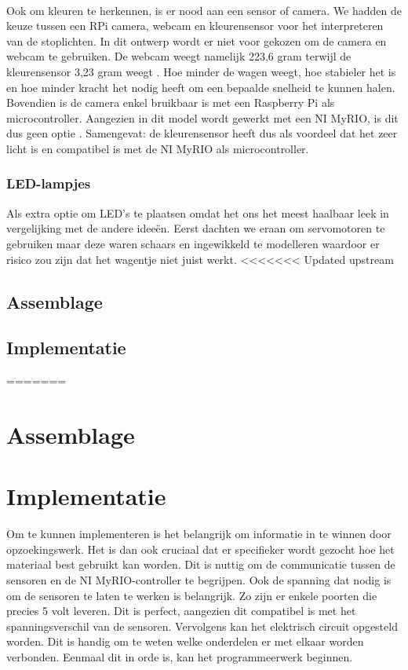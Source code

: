 \documentclass[a4paper,twoside,kulak]{kulakreport} %
\begin{document}
~

Ook om kleuren te herkennen, is er nood aan een sensor of camera. We hadden de keuze tussen een RPi camera, webcam en kleurensensor voor het interpreteren van de stoplichten. In dit ontwerp wordt er niet voor gekozen om de camera en webcam te gebruiken. De webcam weegt namelijk 223,6 gram terwijl de kleurensensor 3,23 gram weegt \cite{Webcam,TCS34725KleurSensorBOB}. Hoe minder de wagen weegt, hoe stabieler het is en hoe minder kracht het nodig heeft om een bepaalde snelheid te kunnen halen. Bovendien is de camera enkel bruikbaar is met een Raspberry Pi als microcontroller. Aangezien in dit model wordt gewerkt met een NI MyRIO, is dit dus geen optie \cite{RPi-camera}. Samengevat: de kleurensensor heeft dus als voordeel dat het zeer licht is en compatibel is met de NI MyRIO als microcontroller.
\label{Sensoren}
~

\subsubsection{LED-lampjes}
Als extra optie om LED's te plaatsen omdat het ons het meest haalbaar leek in vergelijking met de andere ideeën. Eerst dachten we eraan om servomotoren te gebruiken maar deze waren schaars en ingewikkeld te modelleren waardoor er risico zou zijn dat het wagentje niet juist werkt.
<<<<<<< Updated upstream
\label{LED-lampjes}
\subsection{Assemblage}
\label{Assemblage}
\subsection{Implementatie}
\label{Implementatie}
=======

\section{Assemblage}

\section{Implementatie}\label{Implementatie}
Om te kunnen implementeren is het belangrijk om informatie in te winnen door opzoekingswerk. Het is dan ook cruciaal dat er specifieker wordt gezocht hoe het materiaal best gebruikt kan worden.
Dit is nuttig om de communicatie tussen de sensoren en de NI MyRIO-controller te begrijpen. Ook de spanning dat nodig is om de sensoren te laten te werken is belangrijk. Zo zijn er enkele poorten die precies 5 volt leveren. Dit is perfect, aangezien dit compatibel is met het spanningsverschil van de sensoren. Vervolgens kan het elektrisch circuit opgesteld worden. Dit is handig om te weten welke onderdelen er met elkaar worden verbonden. Eenmaal dit in orde is, kan het programmeerwerk beginnen.
\end{document}
